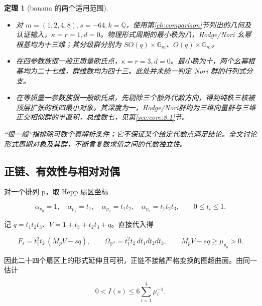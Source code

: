 \documentclass[11pt,a4paper,oneside]{ctexart}
\theoremstyle{cnplain}
\newtheorem{theorem}{定理}[section]
\theoremstyle{definition}
\theoremstyle{remark}
\newcommand{\tightlist}{\setlength{\itemsep}{0pt}\setlength{\parskip}{0pt}}
\numberwithin{equation}{section}
\begin{document}
\begin{theorem}[banana 的两个适用范围]

\label{thm:core:C}

\begin{itemize}
\tightlist
\item
  对 \(m=(1,2,4,8),s=-64,k=\mathbb Q\)，使用第\ref{ch:comparison}节列出的几何及认证输入，\(\kappa=r=1,d=0\)。物理形式周期的最小秩为八，Hodge/Nori 幺幂根基均为十三维；其分级群分别为 \(SO(q)\times\mathbb G_m\)、\(O(q)\times\mathbb G_m\)。
\item
  在四参数族很一般正质量欧氏点，\(\kappa=r=3,d=0\)。最小秩为十，两个幺幂根基均为二十七维，群维数均为四十三。此处并未统一判定 Nori 群的行列式分支。
\item
  在等质量一参数族很一般欧氏点，先剔除三个额外代数方向，得到纯秩三核被顶层扩张的秩四最小对象。其深度为一，Hodge/Nori群均为三维向量群与三维正交相似群的半直积，总维数七，见第\ref{sec:core:8.1}节。
\end{itemize}

``很一般''指排除可数个真解析条件；它不保证某个给定代数点满足结论。全文讨论形式周期对象及其群，不断言复数求值之间的代数独立性。

\end{theorem}


\subsection{正链、有效性与相对对偶}\label{sec:core:2}

对一个排列 p，取 Hepp 扇区坐标

\begin{equation}
\alpha_{p_0}=1,\quad\alpha_{p_1}=t_1,\quad
 \alpha_{p_2}=t_1t_2,\quad\alpha_{p_3}=t_1t_2t_3,
 \qquad 0\leq t_i\leq1.
\end{equation}

记 \(q=t_1t_2t_3\)、\(V=1+t_3+t_2t_3+q\)。直接代入得

\begin{equation}
F_s=t_1^2t_2\,(M_pV-sq),\qquad
 \Omega_{\mathbb P^3}=t_1^2t_2\,dt_1dt_2dt_3,
 \qquad M_pV-sq\geq\mu_{p_0}>0.                        \label{eq:core:2.1}
\end{equation}

因此二十四个扇区上的形式延伸且可积，正链不接触严格变换的图超曲面。由同一估计

\begin{equation}
0<I(s)\leq6\sum_{i=1}^4\mu_i^{-1}.       \label{eq:core:2.2}
\end{equation}
\end{document}
